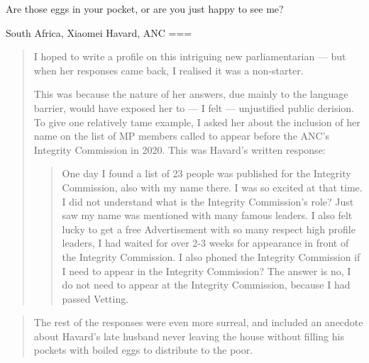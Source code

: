 Are those eggs in your pocket, or are you just happy to see me?

South Africa, Xiaomei Havard, ANC
===
\begin{quote}
I hoped to write a profile on this intriguing new parliamentarian — but when her responses came back, I realised it was a non-starter.

This was because the nature of her answers, due mainly to the language barrier, would have exposed her to — I felt — unjustified public derision. To give one relatively tame example, I asked her about the inclusion of her name on the list of MP members called to appear before the ANC’s Integrity Commission in 2020. This was Havard’s written response:
    \begin{quote}
        One day I found a list of 23 people was published for the Integrity Commission, also with my name there. I was so excited at that time. I did not understand what is the Integrity Commission’s role? Just saw my name was mentioned with many famous leaders. I also felt lucky to get a free Advertisement with so many respect high profile leaders, I had waited for over 2-3 weeks for appearance in front of the Integrity Commission. I also phoned the Integrity Commission if I need to appear in the Integrity Commission? The answer is no, I do not need to appear at the Integrity Commission, because I had passed Vetting.
    \end{quote}
\end{quote}
\begin{quote}
The rest of the responses were even more surreal, and included an anecdote about Havard’s late husband never leaving the house without filling his pockets with boiled eggs to distribute to the poor.
\end{quote}
\nocite{davis2021}
